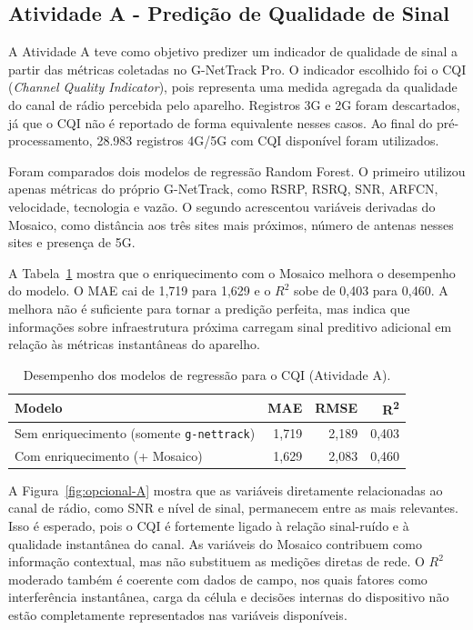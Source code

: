 \documentclass[11pt,a4paper]{article}
\begin{document}
\subsection{Atividade A - Predição de Qualidade de Sinal}
\label{sec:opcional-a}

A Atividade A teve como objetivo predizer um indicador de qualidade de sinal a partir das métricas coletadas no G-NetTrack Pro. O indicador escolhido foi o CQI (\emph{Channel Quality Indicator}), pois representa uma medida agregada da qualidade do canal de rádio percebida pelo aparelho. Registros 3G e 2G foram descartados, já que o CQI não é reportado de forma equivalente nesses casos. Ao final do pré-processamento, 28.983 registros 4G/5G com CQI disponível foram utilizados.

Foram comparados dois modelos de regressão Random Forest. O primeiro utilizou apenas métricas do próprio G-NetTrack, como RSRP, RSRQ, SNR, ARFCN, velocidade, tecnologia e vazão. O segundo acrescentou variáveis derivadas do Mosaico, como distância aos três sites mais próximos, número de antenas nesses sites e presença de 5G.

A Tabela~\ref{tab:opcional-A} mostra que o enriquecimento com o Mosaico melhora o desempenho do modelo. O MAE cai de 1,719 para 1,629 e o $R^2$ sobe de 0,403 para 0,460. A melhora não é suficiente para tornar a predição perfeita, mas indica que informações sobre infraestrutura próxima carregam sinal preditivo adicional em relação às métricas instantâneas do aparelho.

\begin{table}[H]
\centering
\caption{Desempenho dos modelos de regressão para o CQI (Atividade A).}
\label{tab:opcional-A}
\begin{tabular}{lrrr}
\toprule
\textbf{Modelo} & \textbf{MAE} & \textbf{RMSE} & \textbf{R\textsuperscript{2}} \\
\midrule
Sem enriquecimento (somente \texttt{g-nettrack}) & 1,719 & 2,189 & 0,403 \\
Com enriquecimento (+ Mosaico)                   & 1,629 & 2,083 & 0,460 \\
\bottomrule
\end{tabular}
\end{table}

A Figura~\ref{fig:opcional-A} mostra que as variáveis diretamente relacionadas ao canal de rádio, como SNR e nível de
sinal, permanecem entre as mais relevantes. Isso é esperado, pois o CQI é fortemente ligado à relação sinal-ruído e à qualidade instantânea do canal. As variáveis do Mosaico contribuem como informação contextual, mas não substituem as medições diretas de rede. O $R^2$ moderado também é coerente com dados de campo, nos quais fatores como interferência instantânea, carga da célula e decisões internas do dispositivo não estão completamente representados nas variáveis disponíveis.
\end{document}
